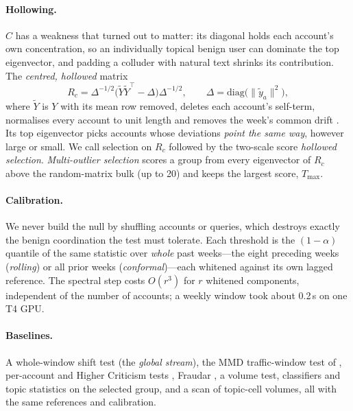 \paragraph{Hollowing.} $C$ has a weakness that turned out to matter: its diagonal holds each account's own concentration, so an individually topical benign user can dominate the top eigenvector, and padding a colluder with natural text shrinks its contribution. The \emph{centred, hollowed} matrix
\[
R_c=\Delta^{-1/2}\bigl(\tilde Y\tilde Y^\top-\Delta\bigr)\Delta^{-1/2},\qquad \Delta=\mathrm{diag}\bigl(\|\tilde y_a\|^2\bigr),
\]
where $\tilde Y$ is $Y$ with its mean row removed, deletes each account's self-term, normalises every account to unit length and removes the week's common drift \citep{cai2021subspace,zhang2022heteroskedastic}. Its top eigenvector picks accounts whose deviations \emph{point the same way}, however large or small. We call selection on $R_c$ followed by the two-scale score \emph{hollowed selection}. \emph{Multi-outlier selection} scores a group from every eigenvector of $R_c$ above the random-matrix bulk (up to 20) and keeps the largest score, $T_{\max}$.

\paragraph{Calibration.} We never build the null by shuffling accounts or queries, which destroys exactly the benign coordination the test must tolerate. Each threshold is the $(1-\alpha)$ quantile of the same statistic over \emph{whole} past weeks---the eight preceding weeks (\emph{rolling}) or all prior weeks (\emph{conformal})---each whitened against its own lagged reference. The spectral step costs $O(r^3)$ for $r$ whitened components, independent of the number of accounts; a weekly window took about 0.2\,s on one T4 GPU.

\paragraph{Baselines.} A whole-window shift test (the \emph{global stream}), the MMD \citep{gretton2012kernel} traffic-window test of \citet{liu2026embarrassingly}, per-account and Higher Criticism tests \citep{donoho2004hc}, Fraudar \citep{hooi2016fraudar}, a volume test, classifiers and topic statistics on the selected group, and a scan of topic-cell volumes, all with the same references and calibration.
